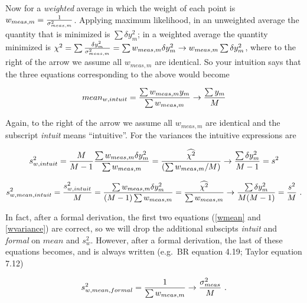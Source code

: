 \documentclass[psfig,preprint]{aastex}
\begin{document}
        Now for a {\it weighted} average in which the weight of each
point is $w_{meas,m} = {1 \over \sigma_{meas,m}^2}$.  Applying maximum
likelihood, in an unweighted average the quantity that is minimized is
$\sum \delta y_m^2$; in a weighted average the quantity minimized is
$\chi^2 = \sum {\delta y_m^2 \over \sigma_{meas,m}^2} = \sum w_{meas,m}
\delta y_m^2 \rightarrow w_{meas,m} \sum \delta y_m^2$, where to the
right of the arrow we assume all $w_{meas,m}$ are identical.  So your
intuition says that the three equations corresponding to the above would
become

\begin{mathletters} \label{wgtideal}
\begin{equation} \label{wmean}  
mean_{w, intuit} = {\sum w_{meas,m}y_m \over \sum w_{meas,m}} \rightarrow { \sum y_m \over M}
\end{equation}

\noindent Again, to the right of the arrow we assume all $w_{meas,m}$
are identical and the subscript {\it intuit} means ``intuitive''. For
the variances the intuitive expressions are

\begin{equation} \label{wvariance}
s_{w,intuit}^2 = 
  {M \over M-1} {\sum w_{meas,m} \delta y_m^2 \over \sum w_{meas,m}} 
  = {\widehat{\chi^2} \over (\sum w_{meas,m}/M)} 
   \rightarrow {\sum \delta y_m^2 \over M-1} = s^2
\end{equation}

\begin{equation} \label{wmeanvariancecc}
s_{w,mean,intuit}^2 = {s_{w,intuit}^2 \over M} = 
  {\sum w_{meas,m} \delta y_m^2 \over (M-1) \sum w_{meas,m}} 
   = {\widehat{\chi^2} \over \sum w_{meas,m}}
   \rightarrow {\sum {\delta y_m^2} \over M(M-1) } = {s^2 \over M} \ .
\end{equation}   
\end{mathletters}

\noindent In fact, after a formal derivation, the first two equations
(\ref {wmean} and \ref{wvariance}) are correct, so we will drop the
additional subscipts {\it intuit} and {\it formal} on $mean$ and
$s_w^2$.  However, after a formal derivation, the last of these
equations becomes, and is always written (e.g.\ BR equation 4.19; Taylor
equation 7.12)
        
\begin{equation} \label{wmeanvariancebb}
s_{w,mean,formal}^2 = {1 \over \sum w_{meas,m}} \rightarrow { \sigma_{meas}^2 \over M}
\ .
\end{equation}
\end{document}
